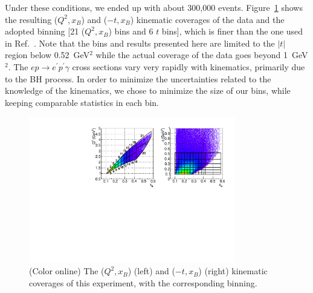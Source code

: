 \documentclass[nofootinbib,twocolumn,showpacs,prl,superscriptaddress,secnumarabic,amssymb,nobibnotes,aps,floatfix]{revtex4-1}
\begin{document}
Under these conditions, we ended up with about 300,000 events.
Figure~\ref{fig:ps} shows the resulting ($Q^2,x_B$) and ($-t,x_B$) kinematic coverages
of the data and the adopted binning [21 ($Q^2,x_B$) bins and 6 $t$ bins],
which is finer than the one used in Ref.~\cite{Girod:2007aa}.
Note that the bins and results presented here are limited to the $|t|$ region below
0.52~GeV$^2$ while the actual coverage of the data goes beyond 1~GeV$^2$.
The $ep\to e^\prime p^\prime \gamma$ cross sections vary very rapidly
with kinematics,
primarily due to the BH process.
In order to minimize the uncertainties related to the knowledge of the kinematics, 
we chose to minimize the size of our bins, while keeping comparable statistics in
each bin.
\begin{figure}[htb]
\vspace{-0.3cm}
\includegraphics[width=9cm]{fig3.pdf}
\vspace{-0.8cm}
\caption{(Color online) The ($Q^2,x_B$) (left) and ($-t,x_B$) (right) kinematic coverages
of this experiment, with the corresponding binning.}
\label{fig:ps}
\end{figure}
\end{document}
